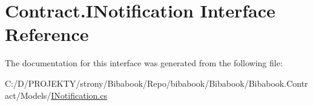 \hypertarget{interface_contract_1_1_i_notification}{}\section{Contract.\+I\+Notification Interface Reference}
\label{interface_contract_1_1_i_notification}


The documentation for this interface was generated from the following file\+:\begin{DoxyCompactItemize}
\item 
C\+:/\+D/\+P\+R\+O\+J\+E\+K\+T\+Y/strony/\+Bibabook/\+Repo/bibabook/\+Bibabook/\+Bibabook.\+Contract/\+Models/\hyperlink{_i_notification_8cs}{I\+Notification.\+cs}\end{DoxyCompactItemize}
